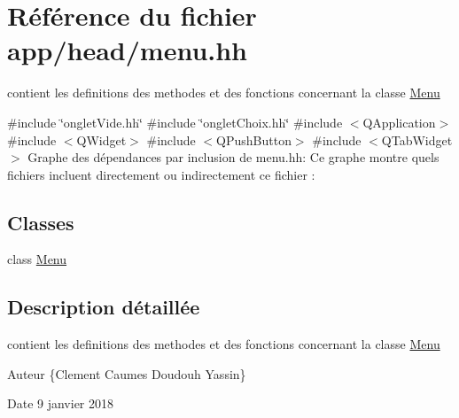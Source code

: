 \hypertarget{menu_8hh}{}\section{Référence du fichier app/head/menu.hh}
\label{menu_8hh}


contient les definitions des methodes et des fonctions concernant la classe \hyperlink{classMenu}{Menu}  


{\ttfamily \#include \char`\"{}onglet\+Vide.\+hh\char`\"{}}\newline
{\ttfamily \#include \char`\"{}onglet\+Choix.\+hh\char`\"{}}\newline
{\ttfamily \#include $<$Q\+Application$>$}\newline
{\ttfamily \#include $<$Q\+Widget$>$}\newline
{\ttfamily \#include $<$Q\+Push\+Button$>$}\newline
{\ttfamily \#include $<$Q\+Tab\+Widget$>$}\newline
Graphe des dépendances par inclusion de menu.\+hh\+:
Ce graphe montre quels fichiers incluent directement ou indirectement ce fichier \+:
\subsection*{Classes}
\begin{DoxyCompactItemize}
\item 
class \hyperlink{classMenu}{Menu}
\end{DoxyCompactItemize}


\subsection{Description détaillée}
contient les definitions des methodes et des fonctions concernant la classe \hyperlink{classMenu}{Menu} 

\begin{DoxyAuthor}{Auteur}
\{Clement Caumes Doudouh Yassin\} 
\end{DoxyAuthor}
\begin{DoxyDate}{Date}
9 janvier 2018 
\end{DoxyDate}
